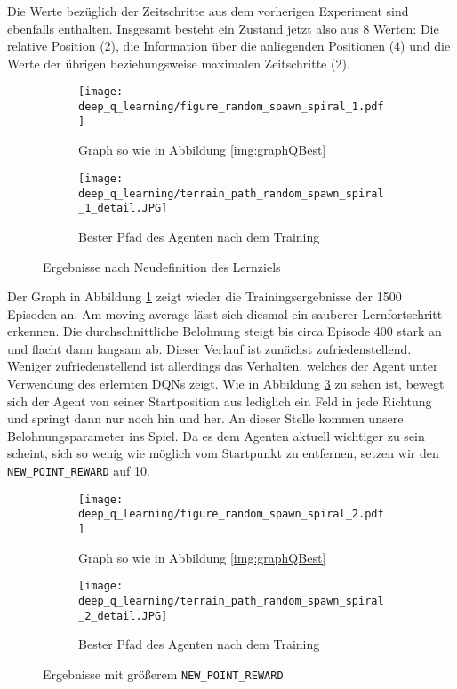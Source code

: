 Die Werte bezüglich der Zeitschritte aus dem vorherigen Experiment sind ebenfalls enthalten. Insgesamt besteht ein Zustand jetzt also aus 8 Werten: Die relative Position (2), die Information über die anliegenden Positionen (4) und die Werte der übrigen beziehungsweise maximalen Zeitschritte (2).
\begin{figure}[h!]
    \centering
    \begin{subfigure}[b]{0.59\textwidth}
        \texttt{[image: deep\_q\_learning/figure\_random\_spawn\_spiral\_1.pdf]}
        \caption{Graph so wie in Abbildung \ref{img:graphQBest}}
        \label{img:graphDeepQRandomSpawnSpiral1}
    \end{subfigure}
    \begin{subfigure}[b]{0.4\textwidth}
        \texttt{[image: deep\_q\_learning/terrain\_path\_random\_spawn\_spiral\_1\_detail.JPG]}
        \caption{Bester Pfad des Agenten nach dem Training}
        \label{img:pathDeepQRandomSpawnSpiral1}
    \end{subfigure}
    \caption{Ergebnisse nach Neudefinition des Lernziels}
\end{figure}
Der Graph in Abbildung \ref{img:graphDeepQRandomSpawnSpiral1} zeigt wieder die Trainingsergebnisse der 1500 Episoden an. Am moving average lässt sich diesmal ein sauberer Lernfortschritt erkennen. Die durchschnittliche Belohnung steigt bis circa Episode 400 stark an und flacht dann langsam ab. Dieser Verlauf ist zunächst zufriedenstellend. Weniger zufriedenstellend ist allerdings das Verhalten, welches der Agent unter Verwendung des erlernten DQNs zeigt. Wie in Abbildung \ref{img:pathDeepQRandomSpawnSpiral1} zu sehen ist, bewegt sich der Agent von seiner Startposition aus lediglich ein Feld in jede Richtung und springt dann nur noch hin und her.
An dieser Stelle kommen unsere Belohnungsparameter ins Spiel. Da es dem Agenten aktuell wichtiger zu sein scheint, sich so wenig wie möglich vom Startpunkt zu entfernen, setzen wir den \texttt{NEW_POINT_REWARD} auf 10.
\begin{figure}[h!]
    \centering
    \begin{subfigure}[b]{0.59\textwidth}
        \texttt{[image: deep\_q\_learning/figure\_random\_spawn\_spiral\_2.pdf]}
        \caption{Graph so wie in Abbildung \ref{img:graphQBest}}
        \label{img:graphDeepQRandomSpawnSpiral2}
    \end{subfigure}
    \begin{subfigure}[b]{0.4\textwidth}
        \texttt{[image: deep\_q\_learning/terrain\_path\_random\_spawn\_spiral\_2\_detail.JPG]}
        \caption{Bester Pfad des Agenten nach dem Training}
        \label{img:pathDeepQRandomSpawnSpiral2}
    \end{subfigure}
    \caption{Ergebnisse mit größerem \texttt{NEW_POINT_REWARD}}
\end{figure}

